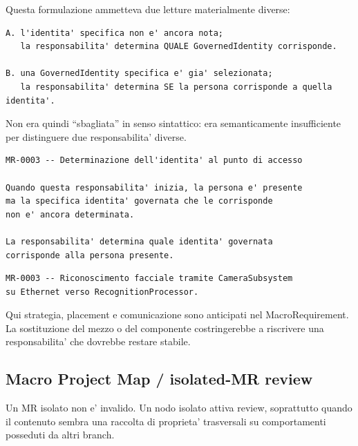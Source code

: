 \documentclass[11pt,a4paper]{article}
\begin{document}
Questa formulazione ammetteva due letture materialmente diverse:

\begin{lstlisting}
A. l'identita' specifica non e' ancora nota;
   la responsabilita' determina QUALE GovernedIdentity corrisponde.

B. una GovernedIdentity specifica e' gia' selezionata;
   la responsabilita' determina SE la persona corrisponde a quella identita'.
\end{lstlisting}

Non era quindi ``sbagliata'' in senso sintattico: era semanticamente insufficiente per distinguere due responsabilita' diverse.

\begin{goodbox}
\begin{lstlisting}
MR-0003 -- Determinazione dell'identita' al punto di accesso

Quando questa responsabilita' inizia, la persona e' presente
ma la specifica identita' governata che le corrisponde
non e' ancora determinata.

La responsabilita' determina quale identita' governata
corrisponde alla persona presente.
\end{lstlisting}
\end{goodbox}

\begin{badbox}
\begin{lstlisting}
MR-0003 -- Riconoscimento facciale tramite CameraSubsystem
su Ethernet verso RecognitionProcessor.
\end{lstlisting}
Qui strategia, placement e comunicazione sono anticipati nel MacroRequirement. La sostituzione del mezzo o del componente costringerebbe a riscrivere una responsabilita' che dovrebbe restare stabile.
\end{badbox}

\subsection{Macro Project Map / isolated-MR review}

\begin{statusworking}
Un MR isolato non e' invalido. Un nodo isolato attiva review, soprattutto quando il contenuto sembra una raccolta di proprieta' trasversali su comportamenti posseduti da altri branch.
\end{statusworking}
\end{document}
